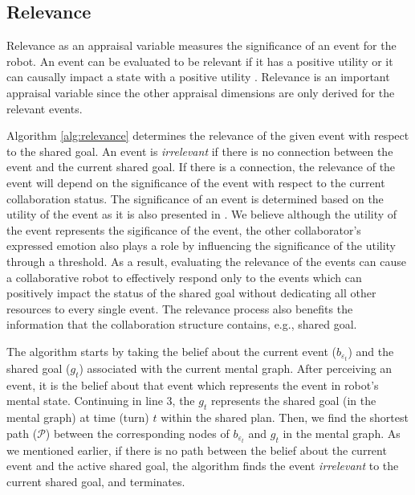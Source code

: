 \documentclass[letterpaper]{article}
\begin{document}
\subsection{Relevance}

Relevance as an appraisal variable measures the significance of an event for the
robot. An event can be evaluated to be relevant if it has a positive utility or
it can causally impact a state with a positive utility
\cite{marsella:ema-process-model}. Relevance is an important appraisal variable
since the other appraisal dimensions are only derived for the relevant events.

Algorithm \ref{alg:relevance} determines the relevance of the given event with
respect to the shared goal. An event is \textit{irrelevant} if there is no
connection between the event and the current shared goal. If there is a
connection, the relevance of the event will depend on the significance of the
event with respect to the current collaboration status. The significance of an
event is determined based on the utility of the event as it is also presented in
\cite{gratch:domain-independent,marsella:ema-process-model}. We believe although
the utility of the event represents the sigificance of the event, the other
collaborator's expressed emotion also plays a role by influencing the
significance of the utility through a threshold. As a result, evaluating the
relevance of the events can cause a collaborative robot to effectively respond
only to the events which can positively impact the status of the shared goal
without dedicating all other resources to every single event. The relevance
process also benefits the information that the collaboration structure contains,
e.g., shared goal.

The algorithm starts by taking the belief about the current event
($\mathit{b}_{\varepsilon_t}$) and the shared goal ($g_{t}$) associated with the
current mental graph. After perceiving an event, it is the belief about that
event which represents the event in robot's mental state. Continuing in line 3,
the $g_{t}$ represents the shared goal (in the mental graph) at time (turn) $t$
within the shared plan. Then, we find the shortest path ($\mathcal{P}$) between
the corresponding nodes of $\mathit{b}_{\varepsilon_t}$ and $g_{t}$ in the
mental graph. As we mentioned earlier, if there is no path between the belief
about the current event and the active shared goal, the algorithm finds the
event \textit{irrelevant} to the current shared goal, and terminates.
\end{document}
